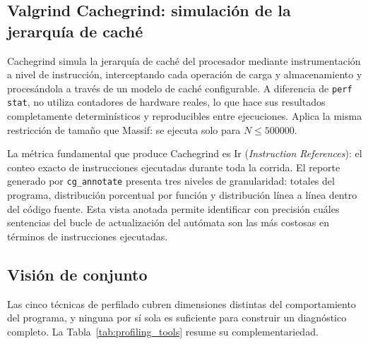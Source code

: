 \subsection{Valgrind Cachegrind: simulación de la jerarquía de caché}

Cachegrind simula la jerarquía de caché del procesador mediante instrumentación a
nivel de instrucción, interceptando cada operación de carga y almacenamiento y
procesándola a través de un modelo de caché configurable.
A diferencia de \texttt{perf stat}, no utiliza contadores de hardware reales, lo
que hace sus resultados completamente determinísticos y reproducibles entre
ejecuciones.
Aplica la misma restricción de tamaño que Massif: se ejecuta solo para
$N \leq 500000$.

La métrica fundamental que produce Cachegrind es Ir (\textit{Instruction
References}): el conteo exacto de instrucciones ejecutadas durante toda la corrida.
El reporte generado por \texttt{cg\_annotate} presenta tres niveles de granularidad:
totales del programa, distribución porcentual por función y distribución línea a
línea dentro del código fuente.
Esta vista anotada permite identificar con precisión cuáles sentencias del bucle de
actualización del autómata son las más costosas en términos de instrucciones
ejecutadas.


\subsection{Visión de conjunto}

Las cinco técnicas de perfilado cubren dimensiones distintas del comportamiento del
programa, y ninguna por sí sola es suficiente para construir un diagnóstico completo.
La Tabla~\ref{tab:profiling_tools} resume su complementariedad.

